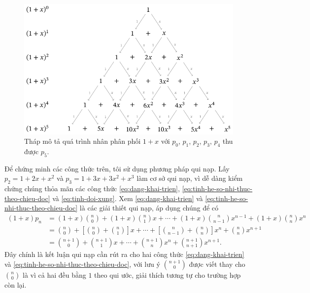 \documentclass[12pt]{article} %
\begin{document}
\begin{figure}[htbp]
    \centering
    \includegraphics[scale=1]{./tex-images/thap-nhan-phan-phoi-den-n-bang-5/thap-nhan-phan-phoi-den-n-bang-5.pdf}
    \caption{Tháp mô tả quá trình nhân phân phối \(1+x\) với \(p_0\), \(p_1\), \(p_2\), \(p_3\), \(p_4\) thu được \(p_5\).}
    \label{fig:thap-nhan-phan-phoi-den-n-bang-5}
\end{figure} 

Để chứng minh các công thức trên, tôi sử dụng phương pháp qui nạp. Lấy \(p_2=1+2x+x^2\) và \(p_3=1+3x+3x^2+x^3\) làm cơ sở qui nạp, vì dễ dàng kiểm chứng chúng thỏa mãn các công thức \eqref{eq:dang-khai-trien}, \eqref{eq:tinh-he-so-nhi-thuc-theo-chieu-doc} và \eqref{eq:tinh-doi-xung}. Xem \eqref{eq:dang-khai-trien} và \eqref{eq:tinh-he-so-nhi-thuc-theo-chieu-doc} là các giải thiết qui nạp, áp dụng chúng để có
\begin{align*}
    (1+x)p_{n}
        & =  (1+x)\binom{n}{0}+(1+x)\binom{n}{1}x+\cdots+(1+x)\binom{n}{n-1}x^{n-1}+(1+x)\binom{n}{n}x^n\\
        & = \binom{n}{0} + \left[\binom{n}{0}+\binom{n}{1}\right] x + \cdots + \left[\binom{n}{n-1}+\binom{n}{n}\right]x^{n}+\binom{n}{n}x^{n+1} \\
        & = \binom{n+1}{0} + \binom{n+1}{1}x+\cdots+\binom{n+1}{n}x^n+\binom{n+1}{n+1}x^{n+1}.
\end{align*}
Đây chính là kết luận qui nạp cần rút ra cho hai công thức \eqref{eq:dang-khai-trien} và \eqref{eq:tinh-he-so-nhi-thuc-theo-chieu-doc}, với lưu ý \(\binom{n+1}{0}\) được viết thay cho \(\binom{n}{0}\) là vì cả hai đều bằng \(1\) theo qui ước, giải thích tương tự cho trường hợp còn lại. 
\end{document}
